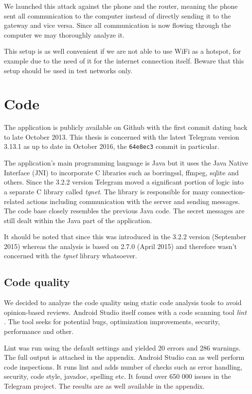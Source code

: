 \documentclass[thesis=M,english]{FITthesis}[2012/10/20]
\begin{document}
We launched this attack against the phone and the router, meaning the phone sent all communication to the computer instead of directly sending it to the gateway and vice versa. Since all communication is now flowing through the computer we may thoroughly analyze it.

This setup is as well convenient if we are not able to use WiFi as a hotspot, for example due to the need of it for the internet connection itself. Beware that this setup should be used in test networks only.

\section{Code}

The application is publicly available on Github \cite{github-telegram} with the first commit dating back to late October 2013. This thesis is concerned with the latest Telegram version 3.13.1 as up to date in October 2016, the \texttt{64e8ec3} commit in particular.

The application's main programming language is Java but it uses the Java Native Interface (JNI) to incorporate C libraries such as borringssl, ffmpeg, sqlite and others. Since the 3.2.2 version Telegram moved a significant portion of logic into a separate C library called \emph{tgnet}. The library is responsible for many connection-related actions including communication with the server and sending messages. The code base closely resembles the previous Java code. The secret messages are still dealt within the Java part of the application.

It should be noted that since this was introduced in the 3.2.2 version (September 2015) whereas the \cite{telegram-aarhus} analysis is based on 2.7.0 (April 2015) and therefore wasn't concerned with the \emph{tgnet} library whatsoever.

\subsection{Code quality}

We decided to analyze the code quality using static code analysis tools to avoid opinion-based reviews. Android Studio itself comes with a code scanning tool \emph{lint} \cite{android-studio-lint}. The tool seeks for potential bugs, optimization improvements, security, performance and other.

Lint was run using the default settings and yielded 20 errors and 286 warnings. The full output is attached in the appendix. Android Studio can as well perform code inspections. It runs lint and adds number of checks such as error handling, security, code style, javadoc, spelling etc. It found over 650 000 issues in the Telegram project. The results are as well available in the appendix. %
\end{document}
